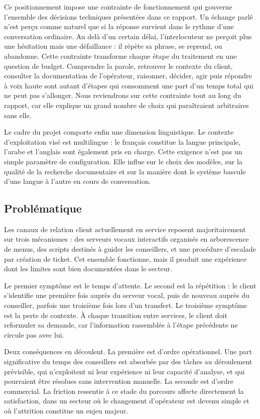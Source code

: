 Ce positionnement impose une contrainte de fonctionnement qui gouverne l'ensemble des décisions techniques présentées dans ce rapport. Un échange parlé n'est perçu comme naturel que si la réponse survient dans le rythme d'une conversation ordinaire. Au delà d'un certain délai, l'interlocuteur ne perçoit plus une hésitation mais une défaillance : il répète sa phrase, se reprend, ou abandonne. Cette contrainte transforme chaque étape du traitement en une question de budget. Comprendre la parole, retrouver le contexte du client, consulter la documentation de l'opérateur, raisonner, décider, agir puis répondre à voix haute sont autant d'étapes qui consomment une part d'un temps total qui ne peut pas s'allonger. Nous reviendrons sur cette contrainte tout au long du rapport, car elle explique un grand nombre de choix qui paraîtraient arbitraires sans elle.

Le cadre du projet comporte enfin une dimension linguistique. Le contexte d'exploitation visé est multilingue : le français constitue la langue principale, l'arabe et l'anglais sont également pris en charge. Cette exigence n'est pas un simple paramètre de configuration. Elle influe sur le choix des modèles, sur la qualité de la recherche documentaire et sur la manière dont le système bascule d'une langue à l'autre en cours de conversation.

\subsection{Problématique}

Les canaux de relation client actuellement en service reposent majoritairement sur trois mécanismes : des serveurs vocaux interactifs organisés en arborescence de menus, des scripts destinés à guider les conseillers, et une procédure d'escalade par création de ticket. Cet ensemble fonctionne, mais il produit une expérience dont les limites sont bien documentées dans le secteur.

Le premier symptôme est le temps d'attente. Le second est la répétition : le client s'identifie une première fois auprès du serveur vocal, puis de nouveau auprès du conseiller, parfois une troisième fois lors d'un transfert. Le troisième symptôme est la perte de contexte. À chaque transition entre services, le client doit reformuler sa demande, car l'information rassemblée à l'étape précédente ne circule pas avec lui.

Deux conséquences en découlent. La première est d'ordre opérationnel. Une part significative du temps des conseillers est absorbée par des tâches au déroulement prévisible, qui n'exploitent ni leur expérience ni leur capacité d'analyse, et qui pourraient être résolues sans intervention manuelle. La seconde est d'ordre commercial. La friction ressentie à ce stade du parcours affecte directement la satisfaction, dans un secteur où le changement d'opérateur est devenu simple et où l'attrition constitue un enjeu majeur.

